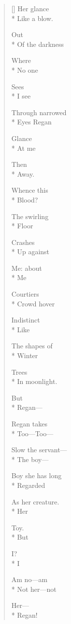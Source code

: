 \label{ch:lear_ar}
\begin{verse}[\versewidth]
 \hspace*{1\vgap} Her glance\\*
Like a blow.

\hspace*{2\vgap} Out\\*
Of the darkness

Where\\*
No one

Sees\\*
I see

Through narrowed\\*
Eyes Regan

Glance\\*
At me

\hspace*{2\vgap} Then\\*
Away.

\hspace*{3\vgap} Whence this\\*
Blood?

The swirling\\*
Floor

Crashes\\*
Up against

Me: about\\*
Me

Courtiers\\*
Crowd\hspace*{1\vgap} hover

Indistinct\\*
\hspace*{2\vgap} Like

The shapes of\\*
Winter

Trees\\*
In moonlight.

\qquad \qquad But\\*
Regan---

Regan takes\\*
Too---Too---

Slow the servant---\\*
The boy---

Boy she has long\\*
Regarded

As her creature.\\*
Her

Toy.\\*
But

I?\\*
I

Am no---am\\*
Not her---not

Her---\\*
\hspace*{1\vgap} Regan!
\end{verse}
